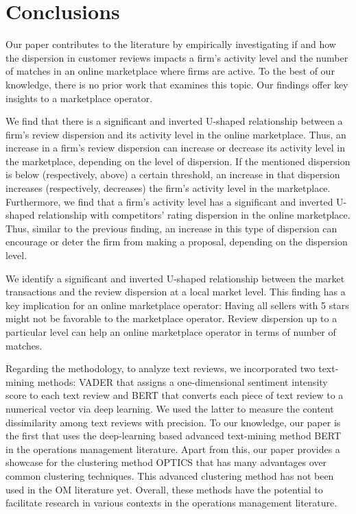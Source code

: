 \documentclass[mnsc,blindrev]{informs3}
\begin{document}
	
	
	
\section{Conclusions}

Our paper contributes to the literature by empirically investigating if and how the dispersion in customer reviews impacts a firm's activity level and the number of matches in an online marketplace where firms are active. To the best of our knowledge, there is no prior work that examines this topic. Our findings offer key insights to a marketplace operator.

We find that there is a significant and inverted U-shaped relationship between a firm's review dispersion and its activity level in the online marketplace. Thus, an increase in a firm's review dispersion can increase or decrease its activity level in the marketplace, depending on the level of dispersion. If the mentioned dispersion is below (respectively, above) a certain threshold, an increase in that dispersion increases (respectively, decreases) the firm's activity level in the marketplace. Furthermore, we find that a firm's activity level  has a significant and inverted U-shaped relationship with competitors' rating dispersion in the online marketplace. Thus, similar to the previous finding, an increase in this type of dispersion can encourage or deter the firm from making a proposal, depending on the dispersion level.

We identify a significant and inverted U-shaped relationship between the market transactions and the review dispersion at a local market level. This finding has a key implication for an online marketplace operator: Having all sellers with 5 stars might not be favorable to the marketplace operator. Review dispersion up to a particular level can help an online marketplace operator in terms of number of matches.


Regarding the methodology, to analyze text reviews, we incorporated two text-mining methods: VADER that assigns a one-dimensional sentiment intensity score to each text review  and BERT that converts each piece of text review to a numerical vector via deep learning. We used the latter to measure the content dissimilarity among text reviews with precision. To our knowledge, our paper is the first that uses the deep-learning based advanced text-mining method BERT in the operations management literature.  Apart from this, our paper provides a showcase for the clustering method OPTICS that has many advantages over common clustering techniques. This advanced clustering method has not been used in the OM literature yet. Overall, these methods have the potential to facilitate research in various contexts in the operations management literature.
	
\end{document}
